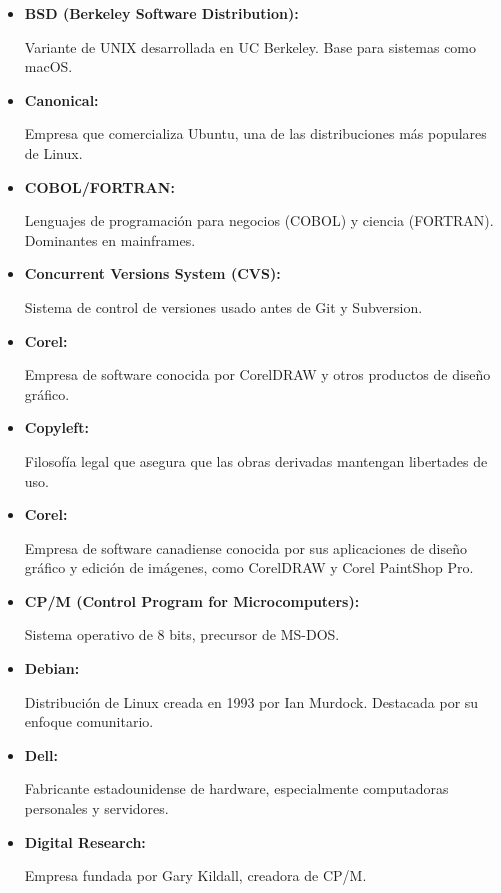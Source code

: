 \documentclass[a4paper,12pt]{article}
\begin{document}
\begin{itemize}
\item \hypertarget{bsd}{\textbf{BSD (Berkeley Software Distribution):}} Variante
de UNIX desarrollada en UC Berkeley. Base para sistemas como macOS.  \label{bsd}

\item \hypertarget{canonical}{\textbf{Canonical:}} Empresa que comercializa
Ubuntu, una de las distribuciones más populares de Linux.  \label{canonical}

\item \hypertarget{cobolfortran}{\textbf{COBOL/FORTRAN:}} Lenguajes de
programación para negocios (COBOL) y ciencia (FORTRAN). Dominantes en
mainframes.  \label{cobolfortran}

\item \hypertarget{concurrent versions system }{\textbf{Concurrent Versions
System (CVS):}} Sistema de control de versiones usado antes de Git y Subversion.
\label{concurrent versions system }

\item \hypertarget{corel}{\textbf{Corel:}} Empresa de software conocida por
CorelDRAW y otros productos de diseño gráfico.  \label{corel}

\item \hypertarget{copyleft}{\textbf{Copyleft:}} Filosofía legal que asegura que
las obras derivadas mantengan libertades de uso.  \label{copyleft}

\item \hypertarget{corel}{\textbf{Corel:}} Empresa de software canadiense
conocida por sus aplicaciones de diseño gráfico y edición de imágenes, como
CorelDRAW y Corel PaintShop Pro.

\item \hypertarget{cpm}{\textbf{CP/M (Control Program for Microcomputers):}}
Sistema operativo de 8 bits, precursor de MS-DOS.  \label{cpm}

\item \hypertarget{debia}{\textbf{Debian:}} Distribución de Linux creada en 1993
por Ian Murdock. Destacada por su enfoque comunitario.  \label{debian}

\item \hypertarget{dell}{\textbf{Dell:}} Fabricante estadounidense de hardware,
especialmente computadoras personales y servidores.  \label{dell}

\item \hypertarget{digitalresearch}{\textbf{Digital Research:}} Empresa fundada
por Gary Kildall, creadora de CP/M.  \label{digitalresearch}


\end{itemize}
\end{document}
